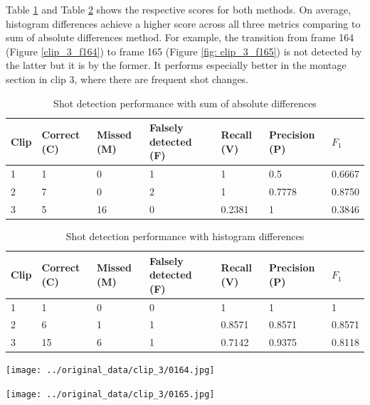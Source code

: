 \documentclass{article}
\begin{document}
Table \ref{tab:sad_results} and Table \ref{tab:hd_results} shows the respective scores for both methods. On average, histogram differences achieve a higher score across all three metrics comparing to sum of absolute differences method. For example, the transition from frame 164 (Figure \ref{clip_3_f164}) to frame 165 (Figure \ref{fig: clip_3_f165}) is not detected by the latter but it is by the former. It performs especially better in the montage section in clip 3, where there are frequent shot changes. 

 \begin{table}[h]
 \caption{Shot detection performance with sum of absolute differences}
  \centering
  \begin{tabular}{lllllll}
    \toprule
    Clip		& Correct (C)	& Missed (M)	& Falsely detected (F) 	& Recall (V) 		& Precision (P) 	& $F_1$ \\
    \midrule
    1			& 	1					& 0					& 1 									& 1					& 0.5					& 0.6667 \\
    2			& 	7					& 0					& 2 									& 1					& 0.7778				& 0.8750 \\
    3			& 	5					& 16					& 0 									& 0.2381			& 1						& 0.3846	\\
    \bottomrule
  \end{tabular}
  \label{tab:sad_results}
\end{table}

\begin{table}[h]
 \caption{Shot detection performance with histogram differences}
  \centering
  \begin{tabular}{lllllll}
    \toprule
    Clip		& Correct (C)	& Missed (M)	& Falsely detected (F) 	& Recall (V) 		& Precision (P) 	& $F_1$ \\
    \midrule
    1			& 	1					& 0					& 0 									& 1					& 1						& 1	\\
    2			& 	6					& 1					& 1 									& 0.8571			& 0.8571				& 0.8571	\\
    3			& 	15				& 6					& 1 									& 0.7142			& 0.9375				& 0.8118	\\
    \bottomrule
  \end{tabular}
  \label{tab:hd_results}
\end{table}

\begin{minipage}{0.5\linewidth}
 \label{clip_3_f164}
\centering
\texttt{[image: ../original\_data/clip\_3/0164.jpg]}
\end{minipage}%
\begin{minipage}{0.5\linewidth}
 \label{fig: clip_3_f165}
\centering
\texttt{[image: ../original\_data/clip\_3/0165.jpg]}
\end{minipage}
\vspace*{10pt}
\end{document}
